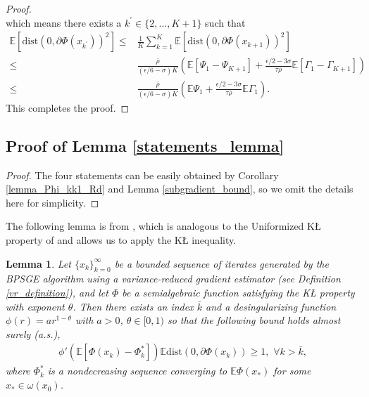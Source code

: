 \documentclass[letterpaper]{article} %
\newtheorem{lemma}{Lemma}
\begin{document}
\begin{proof}
\[		\]
		which means  there exists a  $k^{\prime} \in\{2,\dots,K+1\}$ such that
		\begin{align*}
			\mathbb{E}[\mathrm{dist}(0,\partial\Phi(x_{k^{\prime}}))^{2}]\le&\frac{1}{K}\sum_{k=1}^{K}\mathbb{E}[\mathrm{dist}(0,\partial\Phi(x_{k+1}))^{2}]\\
			\le&\frac{\bar{\rho}}{(\epsilon/6-\sigma)K}(\mathbb{E}[\Psi_{1}-\Psi_{K+1}]+\frac{\epsilon/2-3\sigma}{\tau\bar{\rho}}\mathbb{E}[\Gamma_{1}-\Gamma_{K+1}])\\
			\le&\frac{\bar{\rho}}{(\epsilon/6-\sigma)K}(\mathbb{E}\Psi_{1}+\frac{\epsilon/2-3\sigma}{\tau\bar{\rho}}\mathbb{E}\Gamma_{1}).
		\end{align*}
		This completes the proof.
	\end{proof}

	\subsection{Proof of  Lemma \ref{statements_lemma}}
	\begin{proof}
		The four statements can be easily obtained by Corollary \ref{lemma_Phi_kk1_Rd} and Lemma \ref{subgradient_bound}, so we omit the details here for simplicity.
	\end{proof}
	The following lemma is from \cite{DriggsTLDS2020}, which is analogous to the Uniformized K{\L} property of \cite{BolteST14} and allows us to apply the K{\L} inequality.
	\begin{lemma}\label{E_KL_inequality}
		Let $\{x_{k}\}_{k=0}^{\infty}$ be a bounded sequence of iterates generated by the BPSGE algorithm using a variance-reduced gradient estimator (see Definition \ref{vr_definition}), and let $\Phi$ be a semialgebraic function satisfying the K{\L} property \cite{BolteST14} with exponent $\theta$. Then there exists an index $\bar{k}$ and a desingularizing function $\phi(r) = ar^{1-\theta}$ with $a>0$, $\theta\in[0,1)$  so that the following bound holds almost surely (a.s.),
		\begin{eqnarray}
			\phi'(\mathbb{E}[\Phi(x_{k})-\Phi_{k}^{*}])\mathbb{E}\mbox{dist}(0,\partial\Phi(x_{k}))\ge 1,\,\,\forall k>\bar{k},
		\end{eqnarray}
		where $\Phi_{k}^{*}$ is a nondecreasing sequence  converging to $\mathbb{E}\Phi(x_{*})$ for some $x_{*}\in\omega(x_{0})$.
	\end{lemma}
\end{document}
